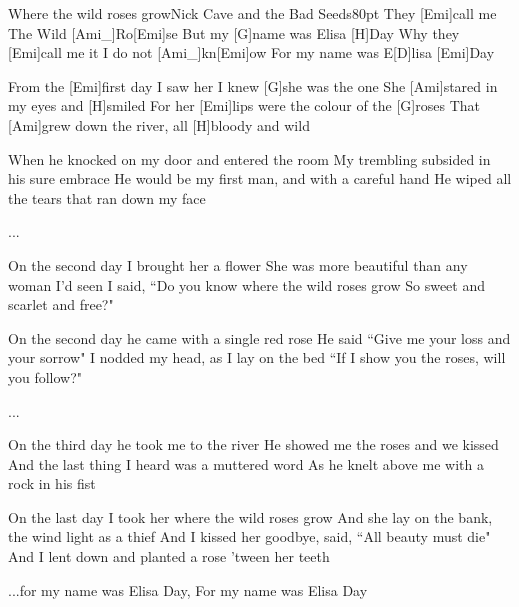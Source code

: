 \begin{song}{Where the wild roses grow}{Nick Cave and the Bad Seeds}{80pt}
\chorus%
They [Emi]call me The Wild [Ami_]{Ro}[Emi]se
But my [G]name was Elisa [H]Day
Why they [Emi]call me it I do not [Ami_]{kn}[Emi]ow
For my name was E[D]lisa [Emi]Day

%
From the [Emi]first day I saw her I knew [G]she was the one
She [Ami]stared in my eyes and [H]smiled
For her [Emi]lips were the colour of the [G]roses
That [Ami]grew down the river, all [H]bloody and wild

When he knocked on my door and entered the room
My trembling subsided in his sure embrace
He would be my first man, and with a careful hand
He wiped all the tears that ran down my face

\chorus ...

%
On the second day I brought her a flower
She was more beautiful than any woman I'd seen
I said, ``Do you know where the wild roses grow
So sweet and scarlet and free?"

On the second day he came with a single red rose
He said ``Give me your loss and your sorrow"
I nodded my head, as I lay on the bed
``If I show you the roses, will you follow?"

\chorus ...

%
On the third day he took me to the river
He showed me the roses and we kissed
And the last thing I heard was a muttered word
As he knelt above me with a rock in his fist

On the last day I took her where the wild roses grow
And she lay on the bank, the wind light as a thief
And I kissed her goodbye, said, ``All beauty must die"
And I lent down and planted a rose 'tween her teeth

\chorus%
...for my name was Elisa Day,
For my name was Elisa Day
\end{song}
